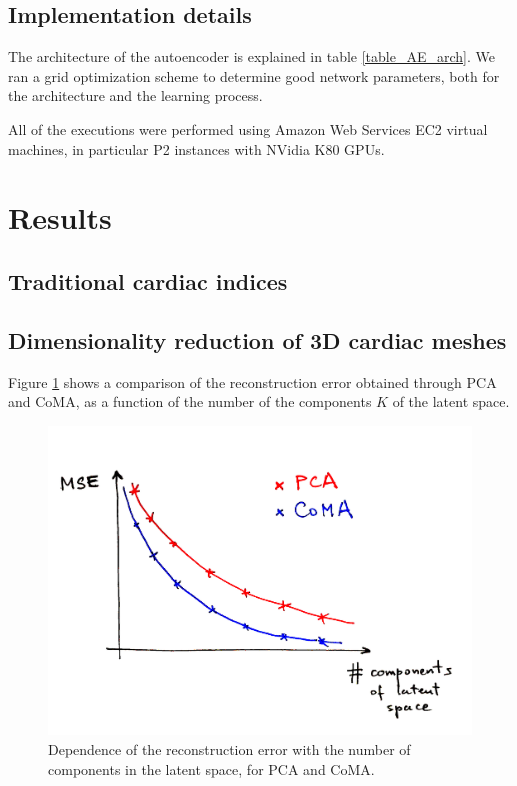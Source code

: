 \documentclass[twocolumn]{llncs}
\begin{document}
\subsection{Implementation details}
The architecture of the autoencoder is explained in table \ref{table_AE_arch}.
We ran a grid optimization scheme to determine good network parameters, both for the architecture and the learning process.

All of the executions were performed using Amazon Web Services EC2 virtual machines, in particular P2 instances with NVidia K80 GPUs.

\section{Results}

\subsection{Traditional cardiac indices}

\subsection{Dimensionality reduction of 3D cardiac meshes}
Figure \ref{fig_pca_vs_coma} shows a comparison of the reconstruction error obtained through PCA and CoMA, as a function of the number of the components $K$ of the latent space. 

\begin{figure}
\includegraphics[width=\linewidth]{figs/mse_pca_vs_coma.jpg}
\caption{Dependence of the reconstruction error with the number of components in the latent space, for PCA and CoMA.}
\label{fig_pca_vs_coma}
\end{figure}
\end{document}
